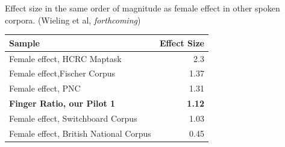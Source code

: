 \documentclass[a0,portrait]{a0poster}
\begin{document}
\begin{multicols}{2}
\noindent Effect size in the same order of magnitude as female effect in other spoken corpora. (Wieling et al, \textsl{forthcoming})
\begin{center}
\begin{tabular}{l r}
\toprule
\textbf{Sample} & \textbf{Effect Size}\\
\midrule
Female effect, HCRC Maptask & 2.3\\
Female effect,Fischer Corpus & 1.37\\
Female effect, PNC & 1.31\\
\textbf{Finger Ratio, our Pilot 1} & \textbf{1.12}\\
Female effect, Switchboard Corpus & 1.03\\
Female effect, British National Corpus & 0.45\\
\bottomrule
\end{tabular}
\end{center}



\end{multicols}
\end{document}
